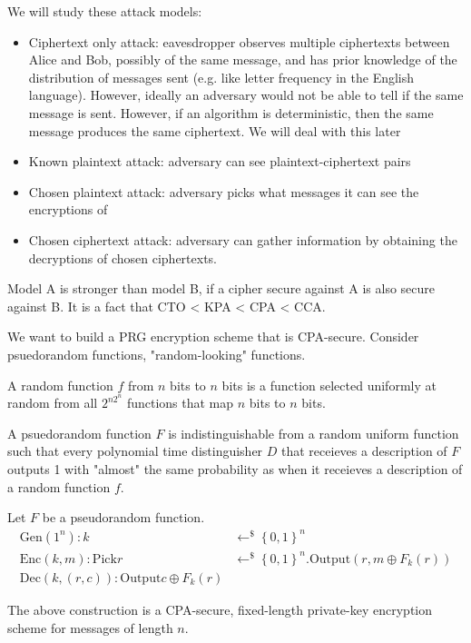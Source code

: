 We will study these attack models: 
\begin{itemize}
    \item Ciphertext only attack: eavesdropper observes multiple ciphertexts between Alice and Bob, possibly of the same message, and has prior knowledge of the distribution of messages sent (e.g. like letter frequency in the English language).
    However, ideally an adversary would not be able to tell 
    if the same message is sent. However, if an algorithm 
    is deterministic, then the same message produces 
    the same ciphertext. We will deal with this later
    \item Known plaintext attack: adversary can see plaintext-ciphertext pairs
    \item Chosen plaintext attack: adversary picks what messages it can see the encryptions of
    \item Chosen ciphertext attack: adversary can gather 
    information by obtaining the decryptions of chosen 
    ciphertexts.
\end{itemize}

Model A is stronger than model B, if a cipher secure against 
A is also secure against B. It is a fact that 
CTO < KPA < CPA < CCA. 

We want to build a PRG encryption scheme that is CPA-secure. 
Consider psuedorandom functions, "random-looking" functions. 

A random function $f$ from $n$ bits to $n$ bits is a function 
selected uniformly at random from all $2^{n2^n}$ functions that 
map $n$ bits to $n$ bits. 

A psuedorandom function $F$ is indistinguishable from a random 
uniform function such that every polynomial time distinguisher 
$D$ that receieves a description of $F$ outputs 1 with "almost" 
the same probability as when it receieves a description of a 
random function $f$. 

Let $F$ be a pseudorandom function. 
\begin{align}
    \text{Gen}(1^n): k &\leftarrow^\mathdollar \left\{0,1\right\}^n \\
    \text{Enc}(k,m): \text{Pick} r &\leftarrow^\mathdollar \left\{0,1\right\}^n. \text{Output} (r, m \oplus F_k(r)) \\
    \text{Dec}(k, (r,c)): \text{Output} c \oplus F_k(r)
\end{align}

The above construction is a CPA-secure, fixed-length private-key encryption
scheme for messages of length $n$. 